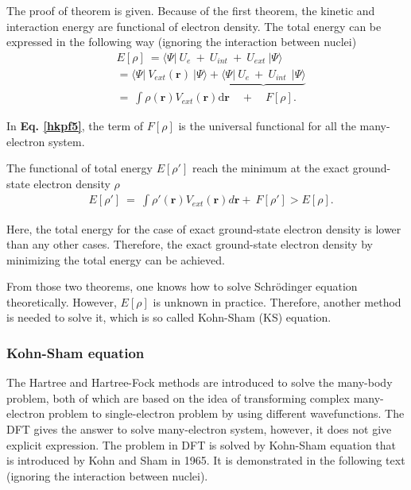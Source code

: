 \documentclass[a4paper, 12pt, titlepage,oneside,drop]{kthesis}
\begin{document}
The proof of theorem is given. Because of the first theorem, the kinetic and interaction energy are functional of electron density. The total energy can be expressed in the following way (ignoring the interaction between nuclei)
\begin{equation}\label{hkpf5}\begin{split}
& E[\rho] \ = \langle \Psi  | \ {U_e} \ + \ {U}_{int}  \ + \ {U}_{ext} \ | \Psi \rangle \\
&     = \langle \Psi  | \ {V}_{ext}(\textbf{r}) \ | \Psi \rangle  + \underbrace{\langle \Psi  | \ {U_e} \ + \ {U}_{int}  \ \ | \Psi \rangle}  \\
&     =   \ \int \rho(\textbf{r}) V_{ext}(\textbf{r}) \mathrm{d}\textbf{r} \quad +  \quad F[\rho]. 
\end{split}
\end{equation}

In \textbf{Eq. \ref{hkpf5}}, the term of $F[\rho]$ is the universal functional for all the many-electron system.

The functional of total energy $E[\rho']$ reach the minimum at the exact ground-state electron density $\rho$
\begin{equation}\begin{split}
 & E[\rho'] \ =   \ \int \rho'(\textbf{r}) V_{ext}(\textbf{r}) d \textbf{r}   + \  F[\rho'] > E[\rho]. 
\end{split}
\end{equation}
 
Here, the total energy for the case of exact ground-state electron density is lower than any other cases. Therefore, the exact ground-state electron density by minimizing the total energy can be achieved.

From those two theorems, one knows how to solve Schrödinger equation theoretically. However, $E[\rho]$ is unknown in practice. Therefore, another method is needed to solve it, which is so called Kohn-Sham (KS) equation.

\subsubsection{Kohn-Sham equation}

The Hartree and Hartree-Fock methods are introduced to solve the many-body problem, both of which are based on the idea of transforming complex 
many-electron problem to single-electron problem by using different wavefunctions. The DFT gives the answer to solve many-electron system, however, it does not give explicit expression.
The problem in DFT is solved by Kohn-Sham equation that is introduced by Kohn and Sham in 1965. It is demonstrated in the following text (ignoring the interaction between nuclei).
\end{document}
